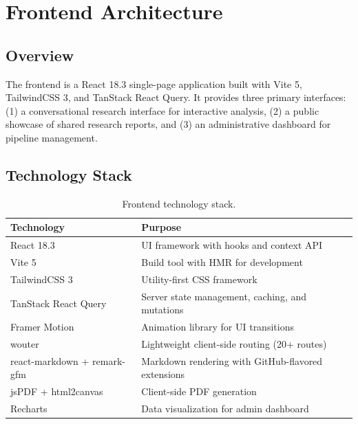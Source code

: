 \chapter{Frontend Architecture}
\label{ch:frontend}

\section{Overview}
\label{sec:frontend:overview}

The \autoscholar frontend is a React 18.3 single-page application built with Vite 5, TailwindCSS 3, and TanStack React Query.
It provides three primary interfaces: (1) a conversational research interface for interactive analysis, (2) a public showcase of shared research reports, and (3) an administrative dashboard for pipeline management.

\section{Technology Stack}
\label{sec:frontend:stack}

\begin{table}[H]
\centering
\caption{Frontend technology stack.}
\label{tab:frontend-stack}
\begin{tabularx}{\textwidth}{lX}
\toprule
\textbf{Technology} & \textbf{Purpose} \\
\midrule
React 18.3 & UI framework with hooks and context API \\
Vite 5 & Build tool with HMR for development \\
TailwindCSS 3 & Utility-first CSS framework \\
TanStack React Query & Server state management, caching, and mutations \\
Framer Motion & Animation library for UI transitions \\
wouter & Lightweight client-side routing (20+ routes) \\
react-markdown + remark-gfm & Markdown rendering with GitHub-flavored extensions \\
jsPDF + html2canvas & Client-side PDF generation \\
Recharts & Data visualization for admin dashboard \\
\bottomrule
\end{tabularx}
\end{table}

